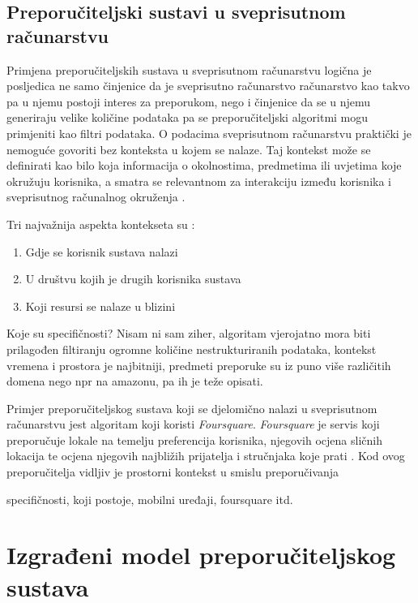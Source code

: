 \documentclass[times, utf8, diplomski, numeric]{fer}
\begin{document}
\section{Preporučiteljski sustavi u sveprisutnom računarstvu}
Primjena preporučiteljskih sustava u sveprisutnom računarstvu logična je
posljedica ne samo činjenice da je sveprisutno računarstvo računarstvo kao takvo
pa u njemu postoji interes za preporukom, nego i činjenice da se u njemu
generiraju velike količine podataka pa se preporučiteljski algoritmi mogu
primjeniti kao filtri podataka. O podacima sveprisutnom računarstvu praktički
je nemoguće govoriti bez konteksta u kojem se nalaze. Taj kontekst može se
definirati kao bilo koja informacija o okolnostima, predmetima ili uvjetima
koje okružuju korisnika, a smatra se relevantnom za interakciju između
korisnika i sveprisutnog računalnog okruženja \cite{RanganathanCampbell}.

Tri najvažnija aspekta kontekseta su \cite{schilit1994context}:
\begin{enumerate}
  \item Gdje se korisnik sustava nalazi
  \item U društvu kojih je drugih korisnika sustava
  \item Koji resursi se nalaze u blizini
\end{enumerate}

Koje su specifičnosti? Nisam ni sam ziher, algoritam vjerojatno mora biti
prilagođen filtiranju ogromne količine nestrukturiranih podataka, kontekst
vremena i prostora je najbitniji, predmeti preporuke su iz puno više različitih
domena nego npr na amazonu, pa ih je teže opisati.

Primjer preporučiteljskog sustava koji se djelomično nalazi u sveprisutnom
računarstvu jest algoritam koji koristi \emph{Foursquare}. \emph{Foursquare} je
servis koji preporučuje lokale na temelju preferencija korisnika, njegovih
ocjena sličnih lokacija te ocjena njegovih najbližih prijatelja i stručnjaka
koje prati \cite{FoursquareAbout}. Kod ovog preporučitelja vidljiv je prostorni
kontekst u smislu preporučivanja

specifičnosti, koji postoje, mobilni uređaji, foursquare itd.
\chapter{Izgrađeni model preporučiteljskog sustava}
\end{document}
